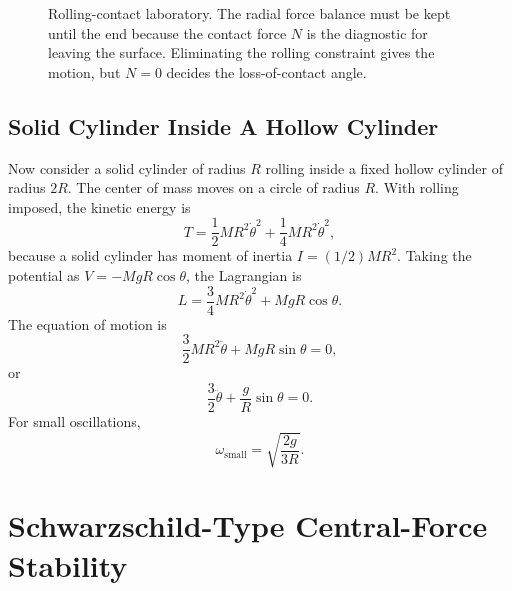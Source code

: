 \begin{figure}[htbp]
\centering
{}
\caption{Rolling-contact laboratory. The radial force balance must be kept
until the end because the contact force \(N\) is the diagnostic for leaving the
surface. Eliminating the rolling constraint gives the motion, but \(N=0\)
decides the loss-of-contact angle.}
\label{fig:lab-rolling-contact}
\end{figure}
\FloatBarrier

\subsection{Solid Cylinder Inside A Hollow Cylinder}

Now consider a solid cylinder of radius \(R\) rolling inside a fixed hollow
cylinder of radius \(2R\). The center of mass moves on a circle of radius
\(R\). With rolling imposed, the kinetic energy is
\[
  T
  =
  \frac12MR^2\dot\theta^2
  +
  \frac14MR^2\dot\theta^2,
\]
because a solid cylinder has moment of inertia \(I=(1/2)MR^2\). Taking the
potential as \(V=-MgR\cos\theta\), the Lagrangian is
\[
  L=\frac34MR^2\dot\theta^2+MgR\cos\theta.
\]
The equation of motion is
\[
  \frac32MR^2\ddot\theta+MgR\sin\theta=0,
\]
or
\[
  \frac32\ddot\theta+\frac{g}{R}\sin\theta=0.
\]
For small oscillations,
\[
  \boxed{
  \omega_{\mathrm{small}}=\sqrt{\frac{2g}{3R}}.
  }
\]

\section{Schwarzschild-Type Central-Force Stability}
\label{sec:lab-schwarzschild-stability}

